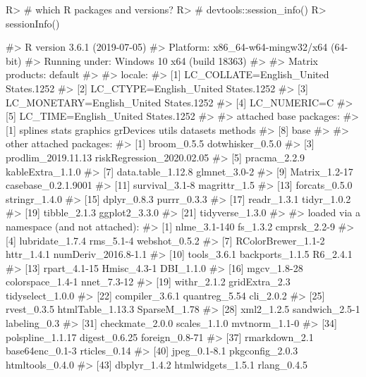 \documentclass[
]{jss}
\begin{document}
\begin{CodeChunk}

\begin{CodeInput}
R> # which R packages and versions?
R> # devtools::session_info()
R> sessionInfo()
\end{CodeInput}

\begin{CodeOutput}
#> R version 3.6.1 (2019-07-05)
#> Platform: x86_64-w64-mingw32/x64 (64-bit)
#> Running under: Windows 10 x64 (build 18363)
#> 
#> Matrix products: default
#> 
#> locale:
#> [1] LC_COLLATE=English_United States.1252 
#> [2] LC_CTYPE=English_United States.1252   
#> [3] LC_MONETARY=English_United States.1252
#> [4] LC_NUMERIC=C                          
#> [5] LC_TIME=English_United States.1252    
#> 
#> attached base packages:
#> [1] splines   stats     graphics  grDevices utils     datasets  methods  
#> [8] base     
#> 
#> other attached packages:
#>  [1] broom_0.5.5               dotwhisker_0.5.0         
#>  [3] prodlim_2019.11.13        riskRegression_2020.02.05
#>  [5] pracma_2.2.9              kableExtra_1.1.0         
#>  [7] data.table_1.12.8         glmnet_3.0-2             
#>  [9] Matrix_1.2-17             casebase_0.2.1.9001      
#> [11] survival_3.1-8            magrittr_1.5             
#> [13] forcats_0.5.0             stringr_1.4.0            
#> [15] dplyr_0.8.3               purrr_0.3.3              
#> [17] readr_1.3.1               tidyr_1.0.2              
#> [19] tibble_2.1.3              ggplot2_3.3.0            
#> [21] tidyverse_1.3.0          
#> 
#> loaded via a namespace (and not attached):
#>  [1] nlme_3.1-140        fs_1.3.2            cmprsk_2.2-9       
#>  [4] lubridate_1.7.4     rms_5.1-4           webshot_0.5.2      
#>  [7] RColorBrewer_1.1-2  httr_1.4.1          numDeriv_2016.8-1.1
#> [10] tools_3.6.1         backports_1.1.5     R6_2.4.1           
#> [13] rpart_4.1-15        Hmisc_4.3-1         DBI_1.1.0          
#> [16] mgcv_1.8-28         colorspace_1.4-1    nnet_7.3-12        
#> [19] withr_2.1.2         gridExtra_2.3       tidyselect_1.0.0   
#> [22] compiler_3.6.1      quantreg_5.54       cli_2.0.2          
#> [25] rvest_0.3.5         htmlTable_1.13.3    SparseM_1.78       
#> [28] xml2_1.2.5          sandwich_2.5-1      labeling_0.3       
#> [31] checkmate_2.0.0     scales_1.1.0        mvtnorm_1.1-0      
#> [34] polspline_1.1.17    digest_0.6.25       foreign_0.8-71     
#> [37] rmarkdown_2.1       base64enc_0.1-3     rticles_0.14       
#> [40] jpeg_0.1-8.1        pkgconfig_2.0.3     htmltools_0.4.0    
#> [43] dbplyr_1.4.2        htmlwidgets_1.5.1   rlang_0.4.5        

\end{CodeOutput}
\end{CodeChunk}
\end{document}
